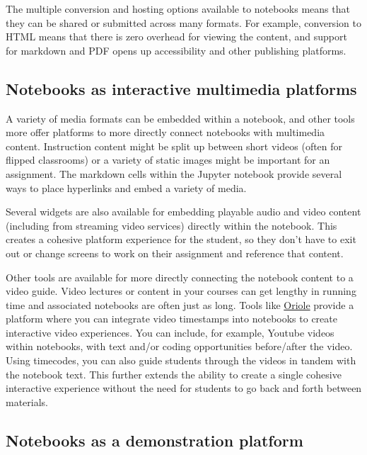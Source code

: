 \documentclass[]{book}
\begin{document}
The multiple conversion and hosting options available to notebooks means that
they can be shared or submitted across many formats. For example, conversion to
HTML means that there is zero overhead for viewing the content, and support for
markdown and PDF opens up accessibility and other publishing platforms.

\hypertarget{notebooks-as-interactive-multimedia-platforms}{%
\subsection{Notebooks as interactive multimedia platforms}\label{notebooks-as-interactive-multimedia-platforms}}

A variety of media formats can be embedded within a notebook, and other tools
more offer platforms to more directly connect notebooks with multimedia content.
Instruction content might be split up between short videos (often for flipped
classrooms) or a variety of static images might be important for an assignment.
The markdown cells within the Jupyter notebook provide several ways to place
hyperlinks and embed a variety of media.

Several widgets are also available for embedding playable audio and video
content (including from streaming video services) directly within the notebook.
This creates a cohesive platform experience for the student, so they don't have
to exit out or change screens to work on their assignment and reference that
content.

Other tools are available for more directly connecting the notebook content to a
video guide. Video lectures or content in your courses can get lengthy in
running time and associated notebooks are often just as long. Tools like
\href{https://www.safaribooksonline.com/oriole/}{Oriole}
provide a platform where you can integrate video timestamps into notebooks to
create interactive video experiences. You can include, for example, Youtube
videos within notebooks, with text and/or coding opportunities before/after the
video. Using timecodes, you can also guide students through the videos in
tandem with the notebook text. This further extends the ability to create a
single cohesive interactive experience without the need for students to go back
and forth between materials.

\hypertarget{notebooks-as-a-demonstration-platform}{%
\subsection{Notebooks as a demonstration platform}\label{notebooks-as-a-demonstration-platform}}
\end{document}
